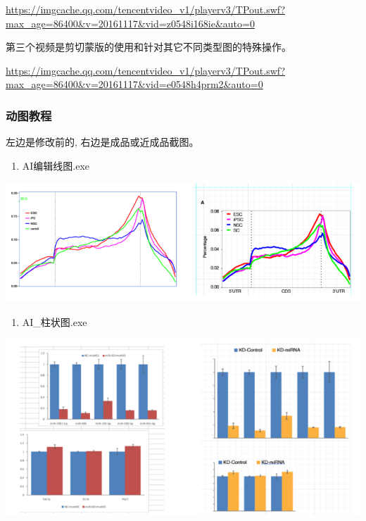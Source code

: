 \documentclass[]{article}
\providecommand{\tightlist}{%
  \setlength{\itemsep}{0pt}\setlength{\parskip}{0pt}}
\numberwithin{figure}{section}
\numberwithin{table}{section}
\theoremstyle{definition}
\theoremstyle{definition}
\theoremstyle{definition}
\theoremstyle{remark}
\begin{document}
\url{https://imgcache.qq.com/tencentvideo_v1/playerv3/TPout.swf?max_age=86400\&v=20161117\&vid=z0548i168ie\&auto=0}

第三个视频是剪切蒙版的使用和针对其它不同类型图的特殊操作。

\url{https://imgcache.qq.com/tencentvideo_v1/playerv3/TPout.swf?max_age=86400\&v=20161117\&vid=e0548h4prm2\&auto=0}

\subsubsection{动图教程}

左边是修改前的, 右边是成品或近成品截图。

\begin{enumerate}
\def\labelenumi{\arabic{enumi}.}
\tightlist
\item
  AI编辑线图.exe
\end{enumerate}

\begin{center}\includegraphics[width=0.95\linewidth,height=0.7\textheight,keepaspectratio]{images/articlePic2nd_3_line} \end{center}

\begin{enumerate}
\def\labelenumi{\arabic{enumi}.}
\setcounter{enumi}{1}
\tightlist
\item
  AI\_柱状图.exe
\end{enumerate}

\begin{center}\includegraphics[width=0.95\linewidth,height=0.7\textheight,keepaspectratio]{images/articlePic2nd_4_bar} \end{center}
\end{document}
